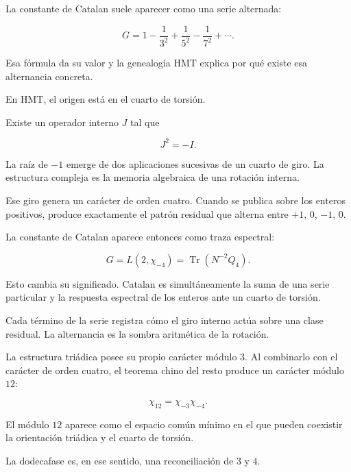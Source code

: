La constante de Catalan suele aparecer como una serie alternada:\par

\[
G
=
1-\frac1{3^2}+\frac1{5^2}-\frac1{7^2}+\cdots.
\]

Esa fórmula da su valor y la genealogía HMT explica por qué existe esa alternancia concreta.\par

En HMT, el origen está en el cuarto de torsión.\par

Existe un operador interno \(J\) tal que\par

\[
J^2=-I.
\]

La raíz de \(-1\) emerge de dos aplicaciones sucesivas de un cuarto de giro. La estructura compleja es la memoria algebraica de una rotación interna.\par

Ese giro genera un carácter de orden cuatro. Cuando se publica sobre los enteros positivos, produce exactamente el patrón residual que alterna entre \(+1\), \(0\), \(-1\), \(0\).\par

La constante de Catalan aparece entonces como traza espectral:\par

\[
G
=
L(2,\chi_{-4})
=
\operatorname{Tr}(N^{-2}Q_4).
\]

Esto cambia su significado. Catalan es simultáneamente la suma de una serie particular y la respuesta espectral de los enteros ante un cuarto de torsión.\par

Cada término de la serie registra cómo el giro interno actúa sobre una clase residual. La alternancia es la sombra aritmética de la rotación.\par

La estructura triádica posee su propio carácter módulo \(3\). Al combinarlo con el carácter de orden cuatro, el teorema chino del resto produce un carácter módulo \(12\):\par

\[
\chi_{12}
=
\chi_{-3}\chi_{-4}.
\]

El módulo \(12\) aparece como el espacio común mínimo en el que pueden coexistir la orientación triádica y el cuarto de torsión.\par

La dodecafase es, en ese sentido, una reconciliación de \(3\) y \(4\).\par

